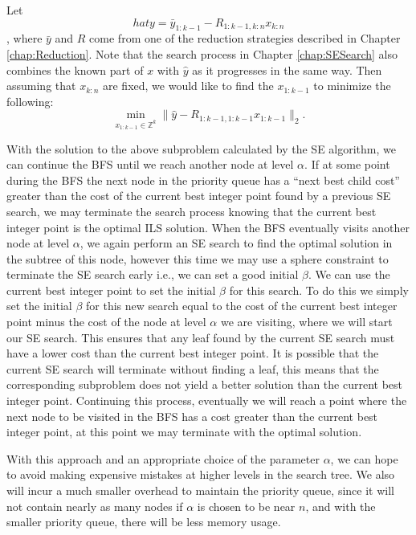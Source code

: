 \documentclass[12pt,Bold,letterpaper]{mcgilletdclass}
\begin{document}
Let $$hat{y} = \bar{y}_{1:k-1} - R_{1:k-1,k:n}x_{k:n}$$, where $\bar{y}$ and $R$ come from one of the reduction strategies described in Chapter \ref{chap:Reduction}. Note that the search process in Chapter \ref{chap:SESearch} also combines the known part of $x$ with $\hat{y}$ as it progresses in the same way. Then assuming that $x_{k:n}$ are fixed, we would like to find the $x_{1:k-1}$ to minimize the following: $$\min_{x_{1:k-1} \in {\mathbb{Z}^k }}  \| \hat{y} - R_{1:k-1,1:k-1}x_{1:k-1} \|_2.$$

With the solution to the above subproblem calculated by the SE algorithm, we can continue the BFS until we reach another node at level $\alpha$. If at some point during the BFS the next node in the priority queue has a ``next best child cost'' greater than the cost of the current best integer point found by a previous SE search, we may terminate the search process knowing that the current best integer point is the optimal ILS solution. When the BFS eventually visits another node at level $\alpha$, we again perform an SE search to find the optimal solution in the subtree of this node, however this time we may use a sphere constraint to terminate the SE search early i.e., we can set a good initial $\beta$. We can use the current best integer point to set the initial $\beta$ for this search. To do this we simply set the initial $\beta$ for this new search equal to the cost of the current best integer point minus the cost of the node at level $\alpha$ we are visiting, where we will start our SE search. This ensures that any leaf found by the current SE search must have a lower cost than the current best integer point. It is possible that the current SE search will terminate without finding a leaf, this means that the corresponding subproblem does not yield a better solution than the current best integer point. Continuing this process, eventually we will reach a point where the next node to be visited in the BFS has a cost greater than the current best integer point, at this point we may terminate with the optimal solution.

With this approach and an appropriate choice of the parameter $\alpha$, we can hope to avoid making expensive mistakes at higher levels in the search tree. We also will incur a much smaller overhead to maintain the priority queue, since it will not contain nearly as many nodes if $\alpha$ is chosen to be near $n$, and with the smaller priority queue, there will be less memory usage. 
\end{document}
